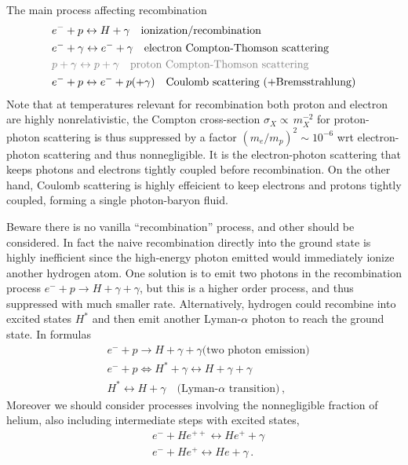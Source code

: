 The main process affecting recombination
\begin{align}\label{eq:interactions_relevant_recombination}
    &e^- + p \leftrightarrow H + \gamma \quad \text{ionization/recombination}\\
    & e^- + \gamma \leftrightarrow e^- + \gamma \quad \text{electron Compton-Thomson scattering}\\
    & {\color{gray} p + \gamma \leftrightarrow p + \gamma\quad \text{proton Compton-Thomson scattering}}\\
    & e^-+p \leftrightarrow e^- + p (+  \gamma )\quad \text{Coulomb scattering (+Bremsstrahlung)}
\end{align}
Note that at temperatures relevant for recombination both proton and electron are highly nonrelativistic, the Compton cross-section $\sigma_X \propto \, m_X^{-2}$ for proton-photon scattering is thus suppressed by a factor $(m_e/m_p)^2 \sim 10^{-6}$ wrt electron-photon scattering and thus nonnegligible.
It is the electron-photon scattering that keeps photons and electrons tightly coupled before recombination. 
On the other hand, Coulomb scattering is highly effeicient to keep electrons and protons tightly coupled, forming a single photon-baryon fluid.

Beware there is no vanilla ``recombination'' process, and other should be considered.
In fact the naive recombination directly into the ground state is highly inefficient since the high-energy photon emitted would immediately ionize another hydrogen atom.
One solution is to emit two photons in the recombination process $e^- + p \to H + \gamma + \gamma$, but this is a higher order process, and thus suppressed with much smaller rate.
Alternatively, hydrogen could recombine into excited states $H^*$ and then emit another Lyman-$\alpha$ photon to reach the ground state.
In formulas
\begin{align}\label{eq:interactions_relevant_recombination_excited_states}
    &e^- + p \to H + \gamma + \gamma \text{(two photon emission)}\\
    &e^-+p \Leftrightarrow H^* + \gamma \leftrightarrow H + \gamma + \gamma\\
    &H^* \leftrightarrow H + \gamma \quad \text{(Lyman-$\alpha$ transition)}\,,
\end{align}
Moreover we should consider processes involving the nonnegligible fraction of helium, also including intermediate steps with excited states,
\begin{align}\label{eq:interactions_relevant_recombination_helium}
    & e^- + He^{++} \leftrightarrow He^{+} + \gamma\\
    & e^- + He^{+} \leftrightarrow He + \gamma\,.
\end{align}

